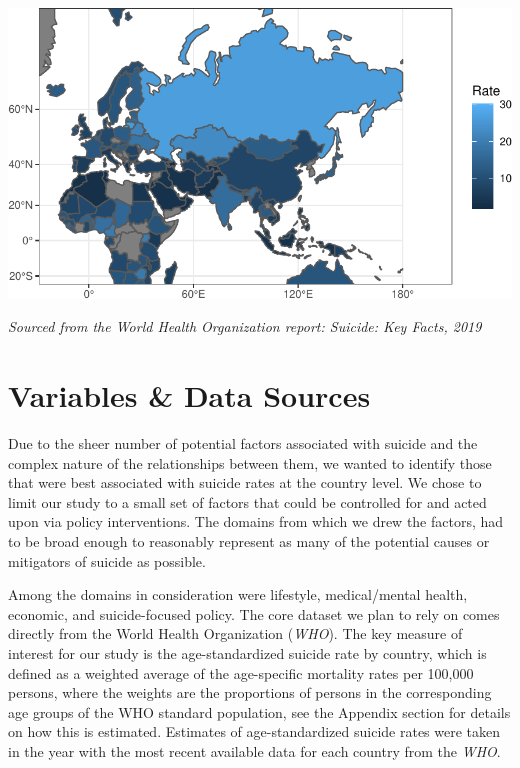 \documentclass[]{article}
\begin{document}
\begin{center}\includegraphics{Project_Report_files/figure-latex/russia_map_plot-1} \end{center}

\emph{Sourced from the World Health Organization report: Suicide: Key
Facts, 2019}

\section{Variables \& Data Sources}\label{variables-data-sources}

Due to the sheer number of potential factors associated with suicide and
the complex nature of the relationships between them, we wanted to
identify those that were best associated with suicide rates at the
country level. We chose to limit our study to a small set of factors
that could be controlled for and acted upon via policy interventions.
The domains from which we drew the factors, had to be broad enough to
reasonably represent as many of the potential causes or mitigators of
suicide as possible.

Among the domains in consideration were lifestyle, medical/mental
health, economic, and suicide-focused policy. The core dataset we plan
to rely on comes directly from the World Health Organization
(\emph{WHO}). The key measure of interest for our study is the
age-standardized suicide rate by country, which is defined as a weighted
average of the age-specific mortality rates per 100,000 persons, where
the weights are the proportions of persons in the corresponding age
groups of the WHO standard population, see the Appendix section for
details on how this is estimated. Estimates of age-standardized suicide
rates were taken in the year with the most recent available data for
each country from the \emph{WHO}.
\end{document}
